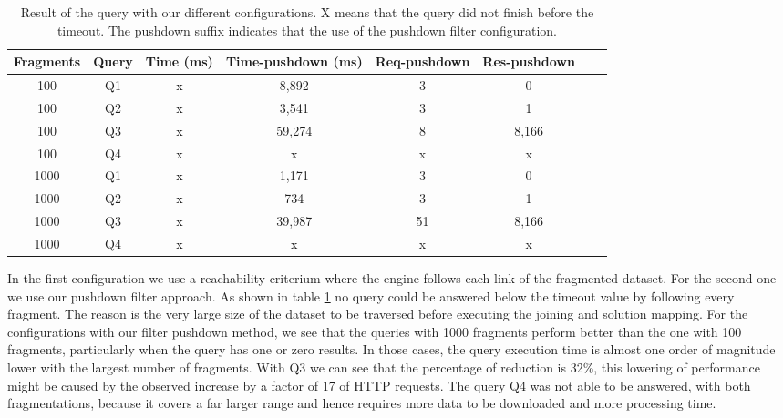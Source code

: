 \begin{table}[ht]
    \centering
    \begin{tabular}{|c|c|c|c|c|c|c|c|}
        \hline
        \textbf{Fragments} & \textbf{Query} & \textbf{Time (ms)}  & \textbf{Time-pushdown (ms)} & \textbf{Req-pushdown} & \textbf{Res-pushdown} \\
        \hline
        100 & Q1 & x & 8,892& 3 & 0 \\
        100 & Q2 & x & 3,541& 3 & 1 \\
        100 & Q3 & x & 59,274& 8 & 8,166 \\
        100 & Q4 & x & x& x & x \\

        1000 & Q1 & x & 1,171& 3 & 0 \\
        1000 & Q2 & x & 734& 3 & 1 \\
        1000 & Q3 & x & 39,987& 51 & 8,166 \\
        1000 & Q4 & x & x& x & x \\
        \hline
    \end{tabular}
    \caption{Result of the query with our different configurations.
    X means that the query did not finish before the timeout.
    The pushdown suffix indicates that the use of the pushdown filter configuration.}
    \label{tab:result}
\end{table}

In the first configuration we use a reachability criterium where the engine follows each link of the fragmented dataset.
For the second one we use our pushdown filter approach.
As shown in table \ref{tab:result} no query could be answered below the timeout value by following every fragment.
The reason is the very large size of the dataset to be traversed before executing the joining and solution mapping.
For the configurations with our filter pushdown method, we see that the queries with 1000 fragments perform better than
the one with 100 fragments, particularly when the query has one or zero results. In those cases, the query execution time is almost one order of magnitude lower with the largest number of fragments.
With Q3 we can see that the percentage of reduction is 32\%, this lowering of performance might be caused by the observed increase by a factor of 17 of HTTP requests. 
The query Q4 was not able to be answered, with both fragmentations, because it covers a far larger range and hence requires more data to be downloaded and more processing time.
